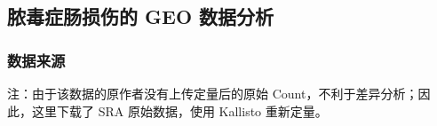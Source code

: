 \documentclass[
]{article}
\begin{document}
\hypertarget{ux8113ux6bd2ux75c7ux80a0ux635fux4f24ux7684-geo-ux6570ux636eux5206ux6790}{%
\subsection{脓毒症肠损伤的 GEO 数据分析}\label{ux8113ux6bd2ux75c7ux80a0ux635fux4f24ux7684-geo-ux6570ux636eux5206ux6790}}

\hypertarget{ux6570ux636eux6765ux6e90}{%
\subsubsection{数据来源}\label{ux6570ux636eux6765ux6e90}}

注：由于该数据的原作者没有上传定量后的原始 Count，不利于差异分析；因此，这里下载了 SRA 原始数据，使用 Kallisto 重新定量。
\end{document}
